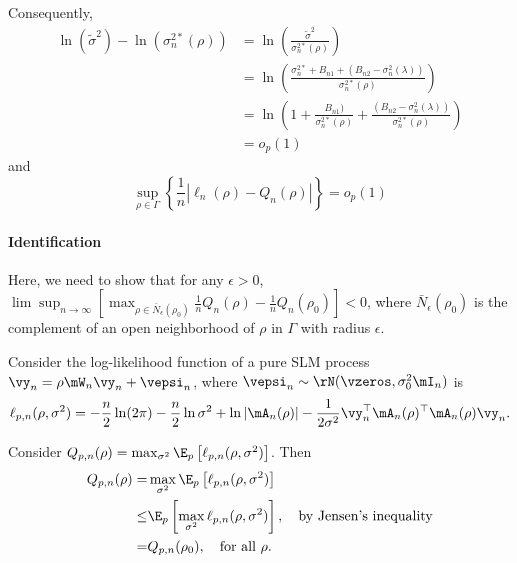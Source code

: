 \documentclass[english,12pt]{book}\usepackage[]{graphicx}\usepackage[]{xcolor}
\begin{document}
\begin{subappendices}
Consequently, 
\begin{equation*}
\begin{aligned}
\ln( \widetilde{\sigma}^{2}) - \ln(\sigma^{2*}_n(\rho)) & = \ln\left(\frac{\widetilde{\sigma}^{2}}{\sigma^{2*}_n(\rho)}\right) \\
& = \ln\left(\frac{\sigma^{2*}_n + B_{n1} + (B_{n2} - \sigma^2_n(\lambda)) }{\sigma^{2*}_n(\rho)}\right) \\
& = \ln\left(1 + \frac{B_{n1}) }{\sigma^{2*}_n(\rho)} + \frac{(B_{n2} - \sigma^2_n(\lambda)) }{\sigma^{2*}_n(\rho)}\right) \\
& = o_p(1)
\end{aligned}
\end{equation*}
%
and
\begin{equation*}
\sup_{\rho\in \Gamma} \left\lbrace \frac{1}{n}\left|  \ell_n(\rho) - Q_n(\rho)\right|\right\rbrace = o_p(1)
\end{equation*}

\paragraph{Identification}

Here, we need to show that for any $\epsilon>0$, $\lim\sup_{n \to \infty}\left[\max_{\rho\in\bar{N}_{\epsilon}(\rho_0)}\frac{1}{n}Q_n(\rho) - \frac{1}{n}Q_n(\rho_0)\right]<0$, where $\bar{N}_{\epsilon}(\rho_0)$ is the complement of an open neighborhood of $\rho$ in $\Gamma$ with radius $\epsilon$.

Consider the log-likelihood function of a pure SLM process $\vy_n = \rho\mW_n\vy_n + \vepsi_n$, where $\vepsi_n \sim \rN(\vzeros, \sigma_0^2\mI_n)$ is
\begin{equation*}
\ell_{p, n}(\rho, \sigma^2)= -\frac{n}{2}\ln(2\pi) - \frac{n}{2}\ln\sigma^2 + \ln\left|\mA_n(\rho)\right|-\frac{1}{2\sigma^2}\vy_n^\top\mA_n(\rho)^\top\mA_n(\rho)\vy_n.
\end{equation*}

Consider $Q_{p,n}(\rho) = \max_{\sigma^2}\E_p\left[\ell_{p, n}(\rho, \sigma^2)\right]$. Then
\begin{equation*}
\begin{aligned}
  Q_{p,n}(\rho)  = &\max_{\sigma^2} \E_p\left[\ell_{p, n}(\rho, \sigma^2)\right] \\
                 \leq & \E_p\left[\max_{\sigma^2}\ell_{p, n}(\rho, \sigma^2)\right],\quad \mbox{by Jensen's inequality} \\
                  = & Q_{p, n}(\rho_0), \quad \mbox{for all $\rho$}. 
\end{aligned}
\end{equation*}


\end{subappendices}
\end{document}
